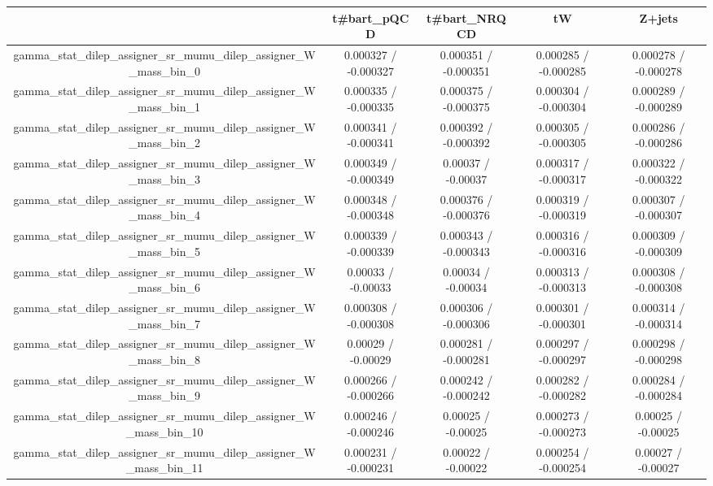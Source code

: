 \documentclass[10pt]{article}
\begin{document}
\begin{table}[htbp]
\begin{center}
\begin{tabular}{|c|c|c|c|c|}
\hline 
      & t#bar{t}_{pQCD}      & t#bar{t}_{NRQCD}      & tW      & Z+jets \\ 
\hline 
  gamma_stat_dilep_assigner_sr_mumu_dilep_assigner_W_mass_bin_0 & 0.000327 / -0.000327 & 0.000351 / -0.000351 & 0.000285 / -0.000285 & 0.000278 / -0.000278 \\ 
  gamma_stat_dilep_assigner_sr_mumu_dilep_assigner_W_mass_bin_1 & 0.000335 / -0.000335 & 0.000375 / -0.000375 & 0.000304 / -0.000304 & 0.000289 / -0.000289 \\ 
  gamma_stat_dilep_assigner_sr_mumu_dilep_assigner_W_mass_bin_2 & 0.000341 / -0.000341 & 0.000392 / -0.000392 & 0.000305 / -0.000305 & 0.000286 / -0.000286 \\ 
  gamma_stat_dilep_assigner_sr_mumu_dilep_assigner_W_mass_bin_3 & 0.000349 / -0.000349 & 0.00037 / -0.00037 & 0.000317 / -0.000317 & 0.000322 / -0.000322 \\ 
  gamma_stat_dilep_assigner_sr_mumu_dilep_assigner_W_mass_bin_4 & 0.000348 / -0.000348 & 0.000376 / -0.000376 & 0.000319 / -0.000319 & 0.000307 / -0.000307 \\ 
  gamma_stat_dilep_assigner_sr_mumu_dilep_assigner_W_mass_bin_5 & 0.000339 / -0.000339 & 0.000343 / -0.000343 & 0.000316 / -0.000316 & 0.000309 / -0.000309 \\ 
  gamma_stat_dilep_assigner_sr_mumu_dilep_assigner_W_mass_bin_6 & 0.00033 / -0.00033 & 0.00034 / -0.00034 & 0.000313 / -0.000313 & 0.000308 / -0.000308 \\ 
  gamma_stat_dilep_assigner_sr_mumu_dilep_assigner_W_mass_bin_7 & 0.000308 / -0.000308 & 0.000306 / -0.000306 & 0.000301 / -0.000301 & 0.000314 / -0.000314 \\ 
  gamma_stat_dilep_assigner_sr_mumu_dilep_assigner_W_mass_bin_8 & 0.00029 / -0.00029 & 0.000281 / -0.000281 & 0.000297 / -0.000297 & 0.000298 / -0.000298 \\ 
  gamma_stat_dilep_assigner_sr_mumu_dilep_assigner_W_mass_bin_9 & 0.000266 / -0.000266 & 0.000242 / -0.000242 & 0.000282 / -0.000282 & 0.000284 / -0.000284 \\ 
  gamma_stat_dilep_assigner_sr_mumu_dilep_assigner_W_mass_bin_10 & 0.000246 / -0.000246 & 0.00025 / -0.00025 & 0.000273 / -0.000273 & 0.00025 / -0.00025 \\ 
  gamma_stat_dilep_assigner_sr_mumu_dilep_assigner_W_mass_bin_11 & 0.000231 / -0.000231 & 0.00022 / -0.00022 & 0.000254 / -0.000254 & 0.00027 / -0.00027 \\ 

\end{tabular}
\end{center}
\end{table}
\end{document}
